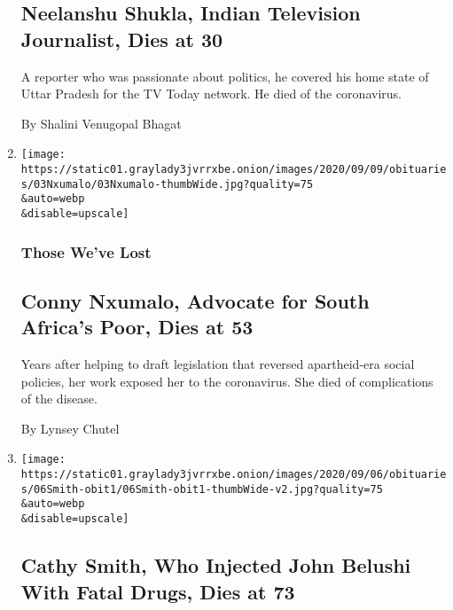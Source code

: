 \begin{enumerate}
{  \subsection{Neelanshu Shukla, Indian Television Journalist, Dies at
  30}\label{neelanshu-shukla-indian-television-journalist-dies-at-30}}

  A reporter who was passionate about politics, he covered his home
  state of Uttar Pradesh for the TV Today network. He died of the
  coronavirus.

  By Shalini Venugopal Bhagat
\item
  \href{/2020/09/04/obituaries/Connie-Nxumalo-virus-lost.html}{}

  \texttt{[image: https://static01.graylady3jvrrxbe.onion/images/2020/09/09/obituaries/03Nxumalo/03Nxumalo-thumbWide.jpg?quality=75\\\&auto=webp\\\&disable=upscale]}

  \hypertarget{those-weve-lost-3}{%
  \subsubsection{Those We've Lost}\label{those-weve-lost-3}}

  \hypertarget{conny-nxumalo-advocate-for-south-africas-poor-dies-at-53}{%
  \subsection{Conny Nxumalo, Advocate for South Africa's Poor, Dies at
  53}\label{conny-nxumalo-advocate-for-south-africas-poor-dies-at-53}}

  Years after helping to draft legislation that reversed apartheid-era
  social policies, her work exposed her to the coronavirus. She died of
  complications of the disease.

  By Lynsey Chutel
\item
  \href{/2020/09/04/us/cathy-smith-dead.html}{}

  \texttt{[image: https://static01.graylady3jvrrxbe.onion/images/2020/09/06/obituaries/06Smith-obit1/06Smith-obit1-thumbWide-v2.jpg?quality=75\\\&auto=webp\\\&disable=upscale]}

  \hypertarget{cathy-smith-who-injected-john-belushi-with-fatal-drugs-dies-at-73}{%
  \subsection{Cathy Smith, Who Injected John Belushi With Fatal Drugs,
  Dies at
  73}\label{cathy-smith-who-injected-john-belushi-with-fatal-drugs-dies-at-73}}


\end{enumerate}
